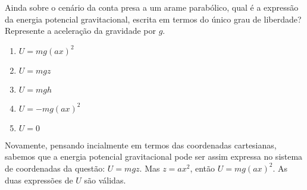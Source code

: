 \begin{question}
    Ainda sobre o cenário da conta presa a um arame parabólico, qual é a expressão da energia potencial gravitacional, escrita em termos do único grau de liberdade?
    Represente a aceleração da gravidade por $g$.
    \begin{enumerate}
      \item $U = mg(ax)^2$ \rightanswer
      \item $U = mgz$ \rightanswer
      \item $U = mgh$
      \item $U = -mg(ax)^2$
      \item $U = 0$
    \end{enumerate}

    \begin{solution}
      Novamente, pensando incialmente em termos das coordenadas cartesianas, sabemos que a energia potencial gravitacional pode ser assim expressa no sistema de coordenadas da questão: $U = mgz$.
      Mas $z = ax^2$, então $U = mg(ax)^2$.
      As duas expressões de $U$ são válidas.
    \end{solution}
\end{question}